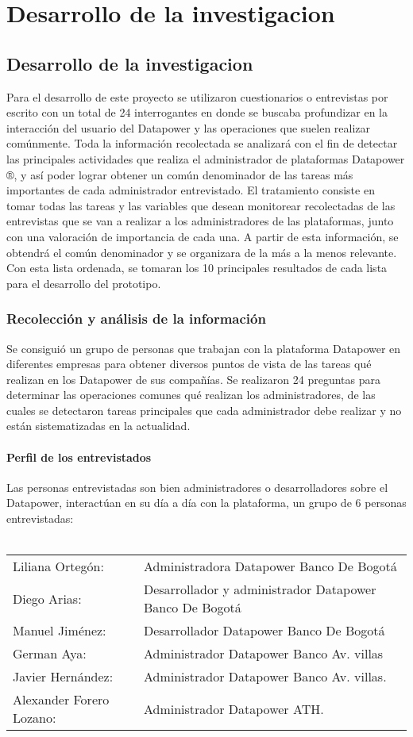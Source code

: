 \chapter{Desarrollo de la investigacion}

\section{Desarrollo de la investigacion}
Para el desarrollo de este proyecto se utilizaron cuestionarios o entrevistas por escrito con un total de 24 interrogantes en donde se buscaba profundizar en la interacción del usuario del Datapower y las operaciones que suelen realizar comúnmente.
Toda la información recolectada se analizará con el fin de detectar las principales actividades que realiza el administrador de plataformas Datapower ®, y así poder lograr obtener un común denominador de las tareas más importantes de cada administrador entrevistado.
\newline
El tratamiento consiste en tomar todas las tareas y las variables que desean monitorear recolectadas de las entrevistas que se van a realizar a los administradores de las plataformas, junto con una valoración de importancia de cada una. A partir de esta información, se obtendrá el común denominador y se organizara de la más a la menos relevante. Con esta lista ordenada, se tomaran los 10 principales resultados de cada lista para el desarrollo del prototipo.
\subsection{Recolección y análisis de la información}
Se consiguió un grupo de personas que trabajan con la plataforma Datapower en diferentes empresas para obtener diversos puntos de vista de las tareas qué realizan en los Datapower de sus compañías. 
\newline
Se realizaron 24 preguntas para determinar las operaciones comunes qué realizan los administradores, de las cuales se detectaron tareas principales que cada administrador debe realizar y no están sistematizadas en la actualidad.
\subsubsection{Perfil de los entrevistados}
Las personas entrevistadas son bien administradores o desarrolladores sobre el Datapower, interactúan en su día a día con la plataforma, un grupo de 6 personas entrevistadas:
\\
\\
\begin{tabu}{ X[l]  X[l] }
Liliana Ortegón: &  Administradora Datapower Banco De Bogotá \\
Diego Arias: &  Desarrollador y administrador Datapower Banco De Bogotá \\
Manuel Jiménez: &  Desarrollador Datapower Banco De Bogotá \\
German Aya: &  Administrador Datapower Banco Av. villas \\
Javier Hernández: &  Administrador Datapower Banco Av. villas. \\
Alexander Forero Lozano: &  Administrador Datapower ATH.    
\end{tabu}



